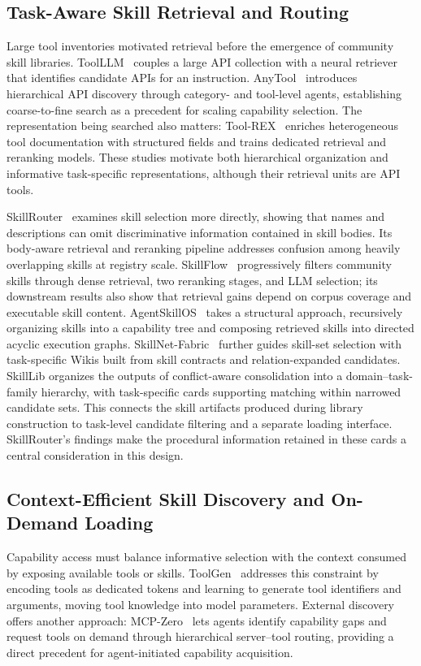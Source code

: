 \documentclass{article}
\theoremstyle{plain}
\theoremstyle{definition}
\theoremstyle{remark}
\begin{document}
\subsection{Task-Aware Skill Retrieval and Routing}
Large tool inventories motivated retrieval before the emergence of community skill libraries.
ToolLLM~\cite{qin2024toolllm} couples a large API collection with a neural retriever that identifies candidate APIs for an instruction.
AnyTool~\cite{du2024anytool} introduces hierarchical API discovery through category- and tool-level agents, establishing coarse-to-fine search as a precedent for scaling capability selection.
The representation being searched also matters: Tool-REX~\cite{lu2026toolrex} enriches heterogeneous tool documentation with structured fields and trains dedicated retrieval and reranking models.
These studies motivate both hierarchical organization and informative task-specific representations, although their retrieval units are API tools.

SkillRouter~\cite{zheng2026skillrouter} examines skill selection more directly, showing that names and descriptions can omit discriminative information contained in skill bodies.
Its body-aware retrieval and reranking pipeline addresses confusion among heavily overlapping skills at registry scale.
SkillFlow~\cite{li2026skillflow} progressively filters community skills through dense retrieval, two reranking stages, and LLM selection; its downstream results also show that retrieval gains depend on corpus coverage and executable skill content.
AgentSkillOS~\cite{li2026agentskillos} takes a structural approach, recursively organizing skills into a capability tree and composing retrieved skills into directed acyclic execution graphs.
SkillNet-Fabric~\cite{liang2026skillnet} further guides skill-set selection with task-specific Wikis built from skill contracts and relation-expanded candidates.
SkillLib organizes the outputs of conflict-aware consolidation into a domain--task-family hierarchy, with task-specific cards supporting matching within narrowed candidate sets.
This connects the skill artifacts produced during library construction to task-level candidate filtering and a separate loading interface.
SkillRouter's findings make the procedural information retained in these cards a central consideration in this design.

\subsection{Context-Efficient Skill Discovery and On-Demand Loading}
Capability access must balance informative selection with the context consumed by exposing available tools or skills.
ToolGen~\cite{wang2025toolgen} addresses this constraint by encoding tools as dedicated tokens and learning to generate tool identifiers and arguments, moving tool knowledge into model parameters.
External discovery offers another approach: MCP-Zero~\cite{fei2025mcpzero} lets agents identify capability gaps and request tools on demand through hierarchical server--tool routing, providing a direct precedent for agent-initiated capability acquisition.
\end{document}
